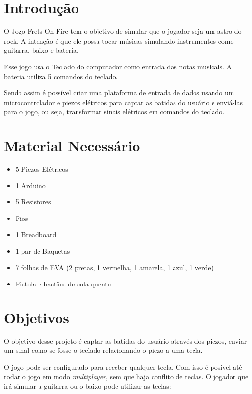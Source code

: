 \section{Introdução}\label{introduuxe7uxe3o}

O Jogo Frets On Fire tem o objetivo de simular que o jogador seja um
astro do rock. A intenção é que ele possa tocar músicas simulando
instrumentos como guitarra, baixo e bateria.

Esse jogo usa o Teclado do computador como entrada das notas musicais. A
bateria utiliza 5 comandos do teclado.

Sendo assim é possível criar uma plataforma de entrada de dados usando
um microcontrolador e piezos elétricos para captar as batidas do usuário
e enviá-las para o jogo, ou seja, transformar sinais elétricos em
comandos do teclado.

\section{Material Necessário}\label{material-necessuxe1rio}

\begin{itemize}
\itemsep1pt\parskip0pt
\item
  5 Piezos Elétricos
\item
  1 Arduino
\item
  5 Resistores 
\item
  Fios
\item
  1 Breadboard
\item
  1 par de Baquetas
\item
  7 folhas de EVA (2 pretas, 1 vermelha, 1 amarela, 1 azul, 1 verde)
\item
  Pistola e bastões de cola quente
\end{itemize}

\section{Objetivos}\label{objetivos}

O objetivo desse projeto é captar as batidas do usuário através dos
piezos, enviar um sinal como se fosse o teclado relacionando o piezo a
uma tecla.

O jogo pode ser configurado para receber qualquer tecla. Com isso é
posível até rodar o jogo em modo \emph{multiplayer}, sem que haja
conflito de teclas. O jogador que irá simular a guitarra ou o baixo pode
utilizar as teclas:

